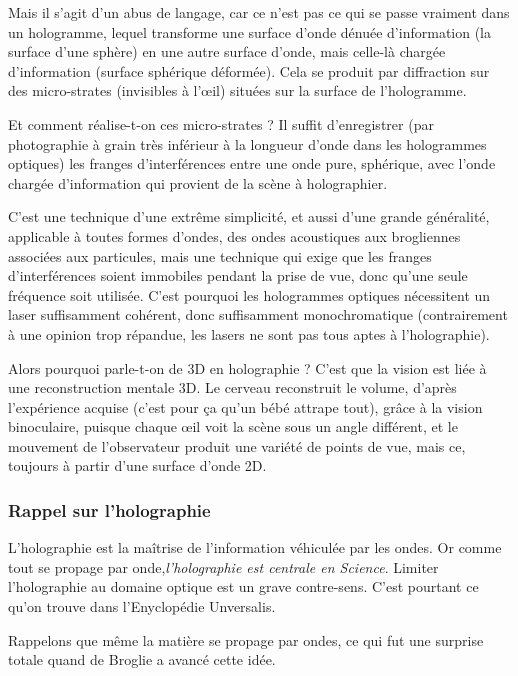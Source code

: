 \documentclass[a4paper,12pt]{article}
\begin{document}
Mais il s'agit d'un abus de langage, car ce n'est pas ce qui se passe vraiment dans un hologramme, lequel transforme une surface d'onde dénuée d'information (la surface d'une sphère) en une autre surface d'onde, mais celle-là chargée d'information (surface sphérique déformée). Cela se produit par diffraction sur des micro-strates (invisibles à l’œil) situées sur la surface de l'hologramme. 


Et comment réalise-t-on ces micro-strates ? Il suffit d'enregistrer (par photographie à grain très inférieur à la longueur d'onde dans les hologrammes optiques) les franges d'interférences entre une onde pure, sphérique, avec l'onde chargée d'information qui provient de la scène à holographier. 


C'est une technique d'une extrême simplicité, et aussi d'une grande généralité, applicable à toutes formes d'ondes, des ondes acoustiques aux brogliennes associées aux particules, mais une  technique qui exige que les franges d'interférences soient immobiles pendant la prise de vue, donc qu'une seule fréquence soit utilisée. C'est pourquoi les hologrammes optiques nécessitent un laser suffisamment cohérent, donc suffisamment monochromatique (contrairement à une opinion trop répandue, les lasers ne sont pas tous aptes à l'holographie).



Alors pourquoi parle-t-on de 3D en holographie ? C'est que la vision est liée à une reconstruction mentale 3D. Le cerveau reconstruit le volume, d'après l'expérience acquise (c'est pour ça qu'un bébé attrape tout), grâce à la vision binoculaire, puisque chaque œil voit la scène sous un angle différent, et le mouvement de l'observateur produit une variété de points de vue, mais ce, toujours à partir d'une surface d'onde 2D.



\subsubsection{Rappel sur l'holographie}

L'holographie est la ma\^itrise de l'information véhiculée par les ondes. Or comme tout se propage par onde,\textit {l'holographie est centrale en Science}. Limiter l'holographie au domaine optique est un grave contre-sens. C'est pourtant ce qu'on trouve dans l'Enyclopédie Unversalis. 



Rappelons que même la matière se propage par ondes, ce qui fut une surprise totale quand de Broglie a avancé cette idée. 
\end{document}
